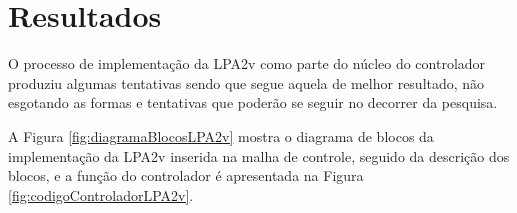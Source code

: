 



\newpage

\section{Resultados}

O processo de implementação da LPA2v como parte do núcleo do controlador 
produziu algumas tentativas sendo que segue aquela de melhor resultado, 
não esgotando as formas e tentativas que poderão se seguir 
no decorrer da pesquisa.


A Figura \ref{fig:diagramaBlocosLPA2v} mostra 
o diagrama de blocos da implementação da 
LPA2v inserida na malha de controle, 
seguido da descrição dos blocos,
e a função do controlador é apresentada na 
Figura \ref{fig:codigoControladorLPA2v}.





